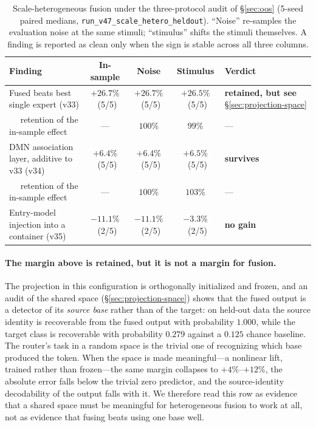 \documentclass[10pt,twoside]{article}
\theoremstyle{definition}
\theoremstyle{plain}
\theoremstyle{remark}
\begin{document}
\begin{table}[htbp]
\centering
\caption{Scale-heterogeneous fusion under the three-protocol audit of \S\ref{sec:oos} (5-seed paired
medians, \texttt{run\_v47\_scale\_hetero\_heldout}). ``Noise'' re-samples the evaluation noise at the
same stimuli; ``stimulus'' shifts the stimuli themselves. A finding is reported as clean only when the
sign is stable across all three columns.}
\label{tab:scale-hetero}
\small
\setlength{\tabcolsep}{4.5pt}
\begin{tabular}{p{}ccc p{}}
\toprule
\textbf{Finding} & \textbf{In-sample} & \textbf{Noise} & \textbf{Stimulus} & \textbf{Verdict} \\
\midrule
Fused beats best single expert (v33) & $+26.7\%$ \ (5/5) & $+26.7\%$ \ (5/5) & $+26.5\%$ \ (5/5) & \textbf{retained, but see} \S\ref{sec:projection-space} \\
$\quad$ retention of the in-sample effect & --- & $100\%$ & $99\%$ & --- \\
DMN association layer, additive to v33 (v34) & $+6.4\%$ \ (5/5) & $+6.4\%$ \ (5/5) & $+6.5\%$ \ (5/5) & \textbf{survives} \\
$\quad$ retention of the in-sample effect & --- & $100\%$ & $103\%$ & --- \\
Entry-model injection into a container (v35) & $-11.1\%$ \ (2/5) & $-11.1\%$ \ (2/5) & $-3.3\%$ \ (2/5) & \textbf{no gain} \\
\bottomrule
\end{tabular}
\end{table}

\paragraph{The margin above is retained, but it is not a margin for fusion.} The projection in this configuration is orthogonally initialized and frozen, and an audit of the shared space (\S\ref{sec:projection-space}) shows that the fused output is a detector of its \emph{source base} rather than of the target: on held-out data the source identity is recoverable from the fused output with probability $1.000$, while the target class is recoverable with probability $0.279$ against a $0.125$ chance baseline. The router's task in a random space is the trivial one of recognizing which base produced the token. When the space is made meaningful---a nonlinear lift, trained rather than frozen---the same margin collapses to $+4\%$--$+12\%$, the absolute error falls below the trivial zero predictor, and the source-identity decodability of the output falls with it. We therefore read this row as evidence that a shared space must be meaningful for heterogeneous fusion to work at all, not as evidence that fusing beats using one base well.
\end{document}
